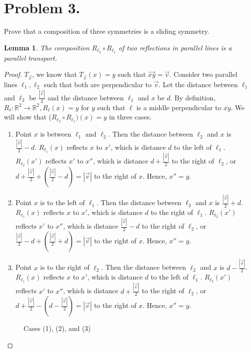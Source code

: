 \documentclass{article}
\newtheorem{lemma}[theorem]{Lemma}
\begin{document}
\section{Problem 3.}
Prove that a composition of three symmetries is a sliding symmetry.
\begin{lemma} \label{3.1}
The composition $R_{\ell_2}\circ R_{\ell_1}$ of two reflections in parallel lines is a parallel transport.
\end{lemma}
\begin{proof}
$T_{\overrightarrow{v}}$, we know that $T_{\overrightarrow{v}}(x)=y$ such that $\overrightarrow{xy}=\overrightarrow{v}$. Consider two parallel lines $\ell_1, \ell_2$ such that both are perpendicular to $\overrightarrow{v}$. Let the distance between $\ell_1$ and $\ell_2$ be $\frac{|\overrightarrow{v}|}{2}$ and the distance between $\ell_1$ and $x$ be $d$. By definition, $R_\ell:\mathbb{R}^2 \rightarrow \mathbb{R}^2, R_\ell(x)=y$ for $y$ such that $\ell$ is a middle perpendicular to $\overline{xy}$. We will show that ($R_{\ell_2}\circ R_{\ell_1})(x)=y$ in three cases.
\begin{enumerate}[label=(\arabic*)]
    \item Point $x$ is between $\ell_1$ and $\ell_2$. Then the distance between $\ell_2$ and $x$ is $\frac{|\overrightarrow{v}|}{2}-d$. $R_{\ell_1}(x)$ reflects $x$ to $x'$, which is distance $d$ to the left of $\ell_1$. $R_{\ell_2}(x')$ reflects $x'$ to $x''$, which is distance $d+\frac{|\overrightarrow{v}|}{2}$ to the right of $\ell_2$, or $d+\frac{|\overrightarrow{v}|}{2}+(\frac{|\overrightarrow{v}|}{2}-d)=|\overrightarrow{v}|$ to the right of $x$. Hence, $x''=y$.
    \item Point $x$ is to the left of $\ell_1$. Then the distance between $\ell_2$ and $x$ is $\frac{|\overrightarrow{v}|}{2}+d$. $R_{\ell_1}(x)$ reflects $x$ to $x'$, which is distance $d$ to the right of $\ell_1$. $R_{\ell_2}(x')$ reflects $x'$ to $x''$, which is distance $\frac{|\overrightarrow{v}|}{2}-d$ to the right of $\ell_2$, or $\frac{|\overrightarrow{v}|}{2}-d+(\frac{|\overrightarrow{v}|}{2}+d)=|\overrightarrow{v}|$ to the right of $x$. Hence, $x''=y$.
    \item Point $x$ is to the right of $\ell_2$. Then the distance between $\ell_2$ and $x$ is $d-\frac{|\overrightarrow{v}|}{2}$. $R_{\ell_1}(x)$ reflects $x$ to $x'$, which is distance $d$ to the left of $\ell_1$. $R_{\ell_2}(x')$ reflects $x'$ to $x''$, which is distance $d+\frac{|\overrightarrow{v}|}{2}$ to the right of $\ell_2$, or $d+\frac{|\overrightarrow{v}|}{2}-(d-\frac{|\overrightarrow{v}|}{2})=|\overrightarrow{v}|$ to the right of $x$. Hence, $x''=y$.
\end{enumerate}

\begin{figure}[h]
    \centering
    
    \caption{Cases (1), (2), and (3)}
\end{figure}

\end{proof}
\end{document}
